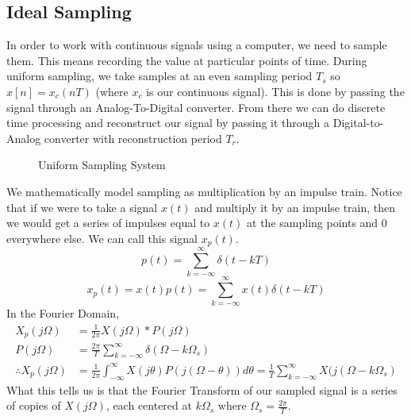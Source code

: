 \subsection{Ideal Sampling}
In order to work with continuous signals using a computer, we need to sample them.
This means recording the value at particular points of time.
During uniform sampling, we take samples at an even sampling period $T_s$ so $x[n]=x_c(nT)$ (where $x_c$ is our continuous signal). 
This is done by passing the signal through an Analog-To-Digital converter.
From there we can do discrete time processing and reconstruct our signal by passing it through a Digital-to-Analog converter with reconstruction period $T_r$.
\begin{gitbook-image}
\begin{figure}[H]
  \centering
  \caption{Uniform Sampling System}
  \label{fig:sampling}
\end{figure}
\end{gitbook-image}
We mathematically model sampling as multiplication by an impulse train. 
Notice that if we were to take a signal $x(t)$ and multiply it by an impulse train, then we would get a series of impulses equal to $x(t)$ at the sampling points and $0$ everywhere else. 
We can call this signal $x_p(t)$.
\[
  p(t) = \sum_{k=-\infty}^{\infty}{\delta(t-kT)}
\]
\[
  x_p(t) = x(t)p(t) = \sum_{k=-\infty}^{\infty}{x(t)\delta(t-kT)}
\]
In the Fourier Domain,
\begin{align*}
    X_p(j\Omega) &= \frac{1}{2\pi}X(j\Omega)*P(j\Omega)\\
    P(j\Omega) &= \frac{2\pi}{T}\sum_{k=-\infty}^{\infty}{\delta(\Omega-k\Omega_s)}\\
    \therefore X_p(j\Omega) &= \frac{1}{2\pi}\int_{-\infty}^{\infty}{X(j\theta)P(j(\Omega-\theta))d\theta} = \frac{1}{T}\sum_{k=-\infty}^{\infty}{X(j(\Omega-k\Omega_s)}
\end{align*}
What this tells us is that the Fourier Transform of our sampled signal is a series of copies of $X(j\Omega)$, each centered at $k\Omega_s$ where $\Omega_s = \frac{2\pi}{T}$. 
